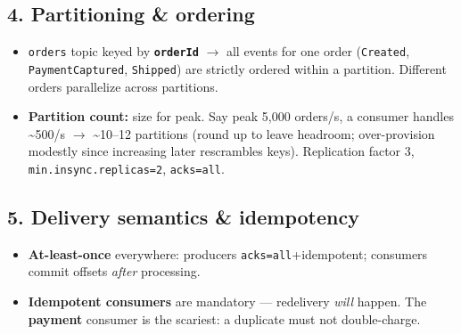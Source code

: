 \documentclass[11pt]{article}
\providecommand{\tightlist}{\setlength{\itemsep}{1pt}\setlength{\parskip}{0pt}}
\begin{document}
\subsection{4. Partitioning \& ordering}\label{4-partitioning--ordering}

\begin{itemize}
\tightlist
\item
  \texttt{orders} topic keyed by \textbf{\texttt{orderId}} \(\rightarrow\) all events for one order (\texttt{Created}, \texttt{PaymentCaptured}, \texttt{Shipped}) are strictly ordered within a partition. Different orders parallelize across partitions.
\item
  \textbf{Partition count:} size for peak. Say peak 5,000 orders/s, a consumer handles \textasciitilde500/s \(\rightarrow\) \textasciitilde10--12 partitions (round up to leave headroom; over-provision modestly since increasing later rescrambles keys). Replication factor 3, \texttt{min.insync.replicas=2}, \texttt{acks=all}.
\end{itemize}

\subsection{5. Delivery semantics \& idempotency}\label{5-delivery-semantics--idempotency}

\begin{itemize}
\tightlist
\item
  \textbf{At-least-once} everywhere: producers \texttt{acks=all}+idempotent; consumers commit offsets \emph{after} processing.
\item
  \textbf{Idempotent consumers} are mandatory --- redelivery \emph{will} happen. The \textbf{payment} consumer is the scariest: a duplicate must not double-charge.
\end{itemize}

\end{document}
